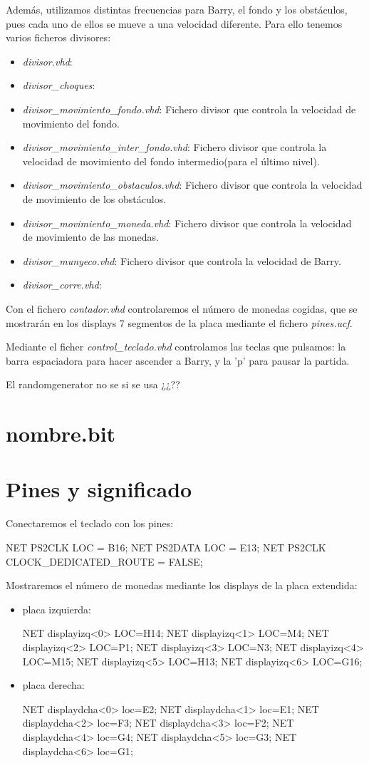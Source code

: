 \documentclass[11pt, a4paper, spanish, openright, twoside]{book}
\begin{document}
Además, utilizamos distintas frecuencias para Barry, el fondo y los obstáculos, pues cada uno de ellos se mueve a una velocidad diferente. Para ello tenemos varios ficheros divisores:
\begin{itemize}
\item \textit{divisor.vhd}: 
\item \textit{divisor\_choques}: 
\item \textit{divisor\_movimiento\_fondo.vhd}: Fichero divisor que controla la velocidad de movimiento del fondo.
\item \textit{divisor\_movimiento\_inter\_fondo.vhd}: Fichero divisor que controla la velocidad de movimiento del fondo intermedio(para el último nivel).
\item \textit{divisor\_movimiento\_obstaculos.vhd}: Fichero divisor que controla la velocidad de movimiento de los obstáculos.
\item \textit{divisor\_movimiento\_moneda.vhd}: Fichero divisor que controla la velocidad de movimiento de las monedas.
\item \textit{divisor\_munyeco.vhd}: Fichero divisor que controla la velocidad de Barry.
\item \textit{divisor\_corre.vhd}: 
\end{itemize}

Con el fichero \textit{contador.vhd} controlaremos el número de monedas cogidas, que se mostrarán en los displays 7 segmentos de la placa mediante el fichero \textit{pines.ucf}.

Mediante el ficher \textit{control\_teclado.vhd} controlamos las teclas que pulsamos: la barra espaciadora para hacer ascender a Barry, y la 'p' para pausar la partida.

El randomgenerator no se si se usa ¿¿??


\section{nombre.bit}


\section{Pines y significado}
Conectaremos el teclado con los pines:

NET PS2CLK LOC = B16;
NET PS2DATA LOC = E13;
NET PS2CLK CLOCK\_DEDICATED\_ROUTE = FALSE;

Mostraremos el número de monedas mediante los displays de la placa extendida:
\begin{itemize}
\item placa izquierda:

NET displayizq<0> LOC=H14;
NET displayizq<1> LOC=M4;
NET displayizq<2> LOC=P1;
NET displayizq<3> LOC=N3;
NET displayizq<4> LOC=M15;
NET displayizq<5> LOC=H13;
NET displayizq<6> LOC=G16;

\item placa derecha:

NET displaydcha<0> loc=E2;
NET displaydcha<1> loc=E1;
NET displaydcha<2> loc=F3;
NET displaydcha<3> loc=F2;
NET displaydcha<4> loc=G4;
NET displaydcha<5> loc=G3;
NET displaydcha<6> loc=G1;
\end{itemize}
\end{document}
